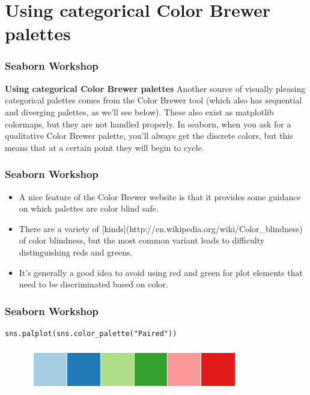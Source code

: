 \documentclass{beamer}
\begin{document}
\section{Using categorical Color Brewer palettes}
\begin{frame}[fragile]
	\frametitle{Seaborn Workshop}
	\large
\textbf{Using categorical Color Brewer palettes}
Another source of visually pleasing categorical palettes comes from the Color Brewer tool (which also has sequential and diverging palettes, as we’ll see below). These also exist as matplotlib colormaps, but they are not handled properly. In seaborn, when you ask for a qualitative Color Brewer palette, you’ll always get the discrete colors, but this means that at a certain point they will begin to cycle.
\end{frame}
\begin{frame}[fragile]
	\frametitle{Seaborn Workshop}
	\large
	\begin{itemize}
\item A nice feature of the Color Brewer website is that it provides some guidance on which palettes are color blind safe. 
\item There are a variety of [kinds](http://en.wikipedia.org/wiki/Color\_blindness) of color blindness, but the most common variant leads to difficulty distinguishing reds and greens.
\item It’s generally a good idea to avoid using red and green for plot elements that need to be discriminated based on color.
\end{itemize}
\end{frame}
\begin{frame}[fragile]
	\frametitle{Seaborn Workshop}
	\large
\begin{verbatim}
sns.palplot(sns.color_palette("Paired"))
\end{verbatim}

\begin{figure}
\centering
\includegraphics[width=0.7\linewidth]{images/color_palettes_16_0}
\caption{}
\label{fig:color_palettes_16_0}
\end{figure}
\end{frame}
\end{document}
